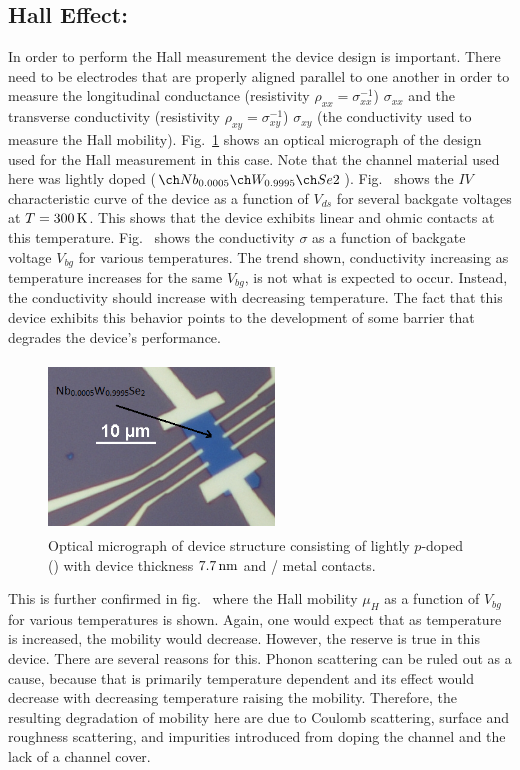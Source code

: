 \subsection{Hall Effect: \lightlyfive}\label{subsec:hall_lightly}
In order to perform the Hall measurement the device design is important. There need to be electrodes that are properly aligned parallel to one another in order to measure the longitudinal conductance (resistivity $\rho_{xx}=\sigma_{xx}^{-1}$) $\sigma_{xx}$ and the transverse conductivity (resistivity $\rho_{xy}=\sigma_{xy}^{-1}$) $\sigma_{xy}$ (the conductivity used to measure the Hall mobility). Fig.~\ref{fig:hall_bar_device1} shows an optical micrograph of the design used for the Hall measurement in this case. Note that the channel material used here was lightly doped  ($\lightlyfive$). Fig.~ shows the $IV$ characteristic curve of the device as a function of $V_{ds}$ for several backgate voltages at $T=300\,\mathrm{K}$. This shows that the device exhibits linear and ohmic contacts at this temperature. Fig.~ shows the conductivity $\sigma$ as a function of backgate voltage $V_{bg}$ for various temperatures. The trend shown, conductivity increasing as temperature increases for the same $V_{bg}$, is not what is expected to occur. Instead, the conductivity should increase with decreasing temperature. The fact that this device exhibits this behavior points to the development of some barrier that degrades the device's performance.  
\begin{figure}[ht]
	\centering
	\includegraphics[height=4.5cm,width=6.0cm]{figs/results/hall_bar_doped_channel/hall_bar_device_pic_11192015_no2_doping_scheme}
	\caption[Hall bar device optical micrograph using \lightlyfive]{Optical micrograph of device structure consisting of lightly $p$-doped  (\lightlyfive) with device thickness $7.7\,\mathrm{nm}$ and / metal contacts.}
	\label{fig:hall_bar_device1}
\end{figure}
This is further confirmed in fig.~ where the Hall mobility $\mu_H$ as a function of $V_{bg}$ for various temperatures is shown. Again, one would expect that as temperature is increased, the mobility would decrease. However, the reserve is true in this device. There are several reasons for this. Phonon scattering can be ruled out as a cause, because that is primarily temperature dependent and its effect would decrease with decreasing temperature raising the mobility. Therefore, the resulting degradation of mobility here are due to Coulomb scattering, surface and roughness scattering, and impurities introduced from doping the channel and the lack of a \hbn channel cover.
